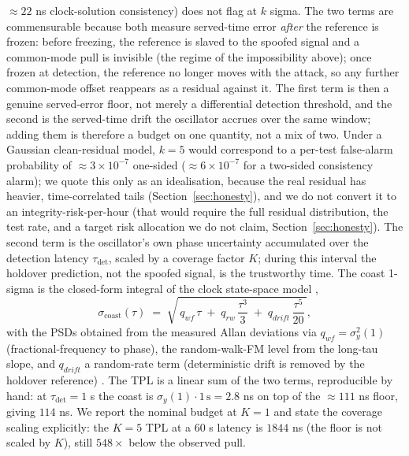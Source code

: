 \documentclass[conference]{IEEEtran}
\begin{document}
$\approx$$22$ ns clock-solution consistency) does not flag at $k$ sigma. The two
terms are commensurable because both measure served-time error \emph{after} the
reference is frozen: before freezing, the reference is slaved to the spoofed signal
and a common-mode pull is invisible (the regime of the impossibility above); once
frozen at detection, the reference no longer moves with the attack, so any further
common-mode offset reappears as a residual against it. The first term is then a
genuine served-error floor, not merely a differential detection threshold, and the
second is the served-time drift the oscillator accrues over the same window; adding
them is therefore a budget on one quantity, not a mix of two. Under a Gaussian
clean-residual model,
$k=5$ would correspond to a per-test false-alarm probability of $\approx
3\times10^{-7}$ one-sided ($\approx 6\times10^{-7}$ for a two-sided consistency
alarm); we quote this only as an idealisation, because the real residual
has heavier, time-correlated tails (Section~\ref{sec:honesty}), and we do not
convert it to an integrity-risk-per-hour (that would require the full residual
distribution, the
test rate, and a target risk allocation we do not claim,
Section~\ref{sec:honesty}). The second term is the oscillator's own phase
uncertainty accumulated over the detection latency $\tau_{\mathrm{det}}$, scaled by
a coverage factor $K$; during this interval the holdover prediction, not the
spoofed signal, is the trustworthy time. The coast 1-sigma is the closed-form
integral of the clock state-space model \cite{vanloan},
\begin{equation}
\sigma_{\mathrm{coast}}(\tau) \;=\;
\sqrt{\, q_{wf}\,\tau \;+\; q_{rw}\,\frac{\tau^{3}}{3} \;+\; q_{drift}\,\frac{\tau^{5}}{20}\,},
\label{eq:coast}
\end{equation}
with the PSDs obtained from the measured Allan deviations via
$q_{wf}=\sigma_y^2(1)$ (fractional-frequency to phase), the random-walk-FM level
from the long-tau slope, and $q_{drift}$ a random-rate term (deterministic drift is
removed by the holdover reference) \cite{riley}. The TPL is a linear sum of the two
terms, reproducible by hand: at $\tau_{\mathrm{det}}=1$ s the coast is
$\sigma_y(1)\cdot 1\,\mathrm{s}=2.8$ ns on top of the $\approx$$111$ ns floor, giving
$114$ ns. We report the nominal budget at $K=1$ and state the coverage scaling
explicitly: the $K=5$ TPL at a $60$ s latency is $1844$ ns (the floor is not scaled
by $K$), still $548\times$ below the observed pull.
\end{document}

